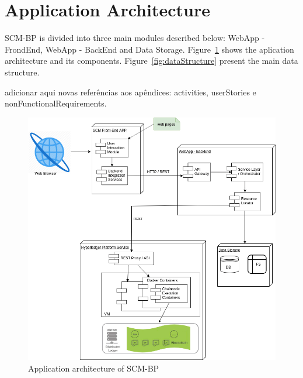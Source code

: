 \section{Application Architecture}\label{sec:applicationArchitecture}

\ac{SCM-BP} is divided into three main modules described below: WebApp - FrondEnd, WebApp - BackEnd and Data Storage. Figure~\ref{fig:detalhamentotecnico} shows the aplication architecture and its components. Figure~\ref{fig:dataStructure} present the main data structure.

{\color{red}adicionar aqui novas referências aos apêndices: activities, userStories e nonFunctionalRequirements.}

\begin{figure}[htbp]
\begin{center}
  \includegraphics[scale=0.55]{images/detalhamentotecnico.png}
\caption{Application architecture of \ac{SCM-BP}}
\label{fig:detalhamentotecnico}
\end{center}
\end{figure}



